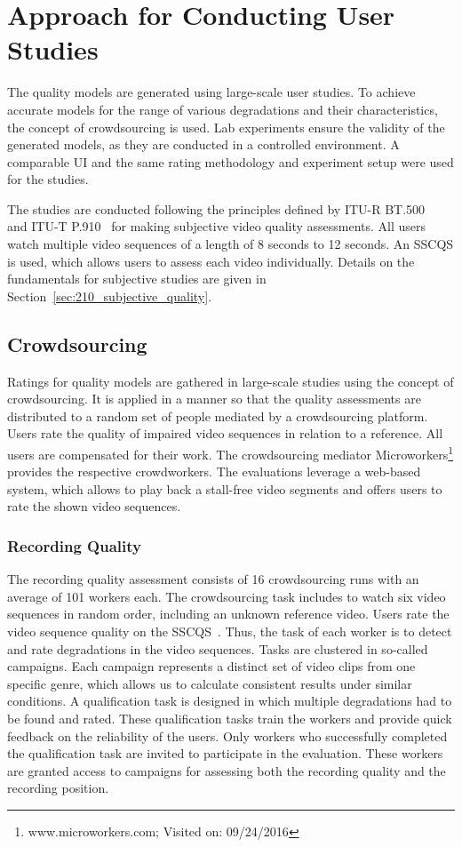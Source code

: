 \section{Approach for Conducting User Studies}
\label{sec:420_approach_recording}
The quality models are generated using large-scale user studies.
To achieve accurate models for the range of various degradations and their characteristics, the concept of crowdsourcing is used. 
Lab experiments ensure the validity of the generated models, as they are conducted in a controlled environment.
A comparable \ac{UI} and the same rating methodology and experiment setup were used for the studies. 

The studies are conducted following the principles defined by \ac{ITU}-R BT.500~\cite{ITU-R2012} and \ac{ITU}-T P.910~\cite{ITU-J2008} for making subjective video quality assessments.
All users watch multiple video sequences of a length of 8 seconds to 12 seconds.
An \ac{SSCQS} is used, which allows users to assess each video individually.
Details on the fundamentals for subjective studies are given in Section~\ref{sec:210_subjective_quality}.
\subsection{Crowdsourcing}
Ratings for quality models are gathered in large-scale studies using the concept of crowdsourcing.
It is applied in a manner so that the quality assessments are distributed to a random set of people mediated by a crowdsourcing platform.
Users rate the quality of impaired video sequences in relation to a reference.
All users are compensated for their work.
The crowdsourcing mediator Microworkers\footnote{www.microworkers.com; Visited on: 09/24/2016} provides the respective crowdworkers.
The evaluations leverage a web-based system, which allows to play back a stall-free video segments and offers users to rate the shown video sequences. 
\subsubsection{Recording Quality}
The recording quality assessment consists of 16 crowdsourcing runs with an average of 101 workers each. 
The crowdsourcing task includes to watch six video sequences in random order, including an unknown reference video. 
Users rate the video sequence quality on the \ac{SSCQS}~\cite{ITU-R2012}.
Thus, the task of each worker is to detect and rate degradations in the video sequences.
Tasks are clustered in so-called campaigns.
Each campaign represents a distinct set of video clips from one specific genre, which allows us to calculate consistent results under similar conditions. 
A qualification task is designed in which multiple degradations had to be found and rated. 
These qualification tasks train the workers and provide quick feedback on the reliability of the users.
Only workers who successfully completed the qualification task are invited to participate in the evaluation. 
These workers are granted access to campaigns for assessing both the recording quality and the recording position.
